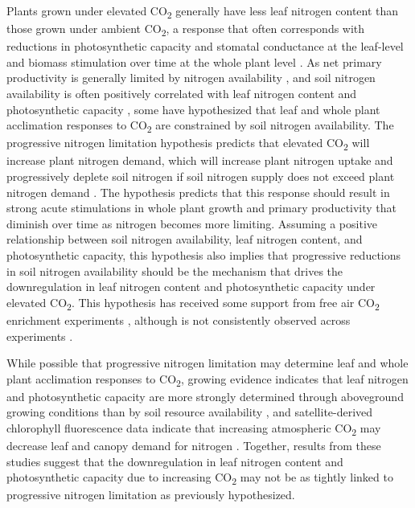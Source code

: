 Plants grown under elevated CO\textsubscript{2} generally have less leaf nitrogen content than those grown under ambient CO\textsubscript{2}, a response that often corresponds with reductions in photosynthetic capacity and stomatal conductance at the leaf-level and biomass stimulation over time at the whole plant level . As net primary productivity is generally limited by nitrogen availability , and soil nitrogen availability is often positively correlated with leaf nitrogen content and photosynthetic capacity , some have hypothesized that leaf and whole plant acclimation responses to CO\textsubscript{2} are constrained by soil nitrogen availability. The progressive nitrogen limitation hypothesis predicts that elevated CO\textsubscript{2} will increase plant nitrogen demand, which will increase plant nitrogen uptake and progressively deplete soil nitrogen if soil nitrogen supply does not exceed plant nitrogen demand . The hypothesis predicts that this response should result in strong acute stimulations in whole plant growth and primary productivity that diminish over time as nitrogen becomes more limiting. Assuming a positive relationship between soil nitrogen availability, leaf nitrogen content, and photosynthetic capacity, this hypothesis also implies that progressive reductions in soil nitrogen availability should be the mechanism that drives the downregulation in leaf nitrogen content and photosynthetic capacity under elevated CO\textsubscript{2}. This hypothesis has received some support from free air CO\textsubscript{2} enrichment experiments , although is not consistently observed across experiments .

While possible that progressive nitrogen limitation may determine leaf and whole plant acclimation responses to CO\textsubscript{2}, growing evidence indicates that leaf nitrogen and photosynthetic capacity are more strongly determined through aboveground growing conditions than by soil resource availability , and satellite-derived chlorophyll fluorescence data indicate that increasing atmospheric CO\textsubscript{2} may decrease leaf and canopy demand for nitrogen . Together, results from these studies suggest that the downregulation in leaf nitrogen content and photosynthetic capacity due to increasing CO\textsubscript{2} may not be as tightly linked to progressive nitrogen limitation as previously hypothesized.

